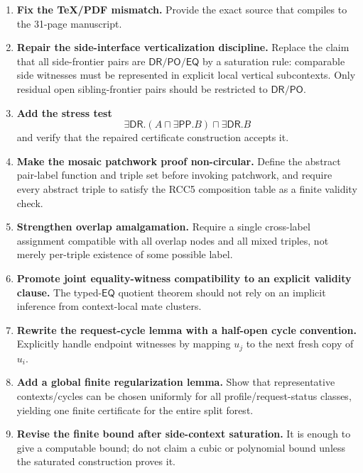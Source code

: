 \documentclass[11pt]{article}
\newcommand{\EQ}{\mathsf{EQ}}
\newcommand{\DR}{\mathsf{DR}}
\newcommand{\PO}{\mathsf{PO}}
\newcommand{\PP}{\mathsf{PP}}
\begin{document}
\begin{enumerate}[leftmargin=2em]
  \item \textbf{Fix the TeX/PDF mismatch.}  Provide the exact source that compiles to the 31-page manuscript.

  \item \textbf{Repair the side-interface verticalization discipline.}  Replace the claim that all side-frontier pairs are $\DR/\PO/\EQ$ by a saturation rule: comparable side witnesses must be represented in explicit local vertical subcontexts.  Only residual open sibling-frontier pairs should be restricted to $\DR/\PO$.

  \item \textbf{Add the stress test}
  \[
  \exists\DR.(A\sqcap\exists\PP.B)\sqcap\exists\DR.B
  \]
  and verify that the repaired certificate construction accepts it.

  \item \textbf{Make the mosaic patchwork proof non-circular.}  Define the abstract pair-label function and triple set before invoking patchwork, and require every abstract triple to satisfy the RCC5 composition table as a finite validity check.

  \item \textbf{Strengthen overlap amalgamation.}  Require a single cross-label assignment compatible with all overlap nodes and all mixed triples, not merely per-triple existence of some possible label.

  \item \textbf{Promote joint equality-witness compatibility to an explicit validity clause.}  The typed-$\EQ$ quotient theorem should not rely on an implicit inference from context-local mate clusters.

  \item \textbf{Rewrite the request-cycle lemma with a half-open cycle convention.}  Explicitly handle endpoint witnesses by mapping $u_j$ to the next fresh copy of $u_i$.

  \item \textbf{Add a global finite regularization lemma.}  Show that representative contexts/cycles can be chosen uniformly for all profile/request-status classes, yielding one finite certificate for the entire split forest.

  \item \textbf{Revise the finite bound after side-context saturation.}  It is enough to give a computable bound; do not claim a cubic or polynomial bound unless the saturated construction proves it.
\end{enumerate}
\end{document}
